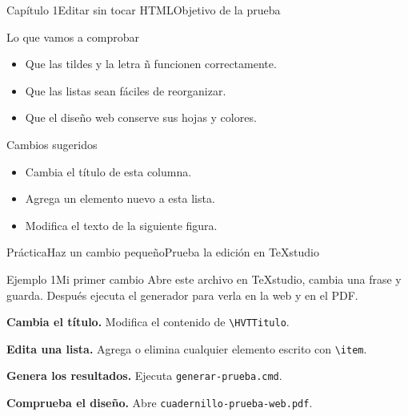 \documentclass{hvtbook}
\begin{document}
\HVTMakeTitle

\begin{HVTPage}{Capítulo 1}{Editar sin tocar HTML}{Objetivo de la prueba}


\begin{HVTGrid}
  \begin{HVTColumn}{Lo que vamos a comprobar}
    \begin{itemize}
      \item Que las tildes y la letra ñ funcionen correctamente.
      \item Que las listas sean fáciles de reorganizar.
      \item Que el diseño web conserve sus hojas y colores.
    \end{itemize}
  \end{HVTColumn}

  \begin{HVTColumn}{Cambios sugeridos}
    \begin{itemize}
      \item Cambia el título de esta columna.
      \item Agrega un elemento nuevo a esta lista.
      \item Modifica el texto de la siguiente figura.
    \end{itemize}
  \end{HVTColumn}
\end{HVTGrid}


\end{HVTPage}

\begin{HVTPage}{Práctica}{Haz un cambio pequeño}{Prueba la edición en TeXstudio}

\begin{HVTExample}{Ejemplo 1}{Mi primer cambio}
Abre este archivo en TeXstudio, cambia una frase y guarda. Después ejecuta el generador para verla en la web y en el PDF.
\end{HVTExample}

\begin{HVTSteps}
  \item \textbf{Cambia el título.} Modifica el contenido de \texttt{\textbackslash HVTTitulo}.
  \item \textbf{Edita una lista.} Agrega o elimina cualquier elemento escrito con \texttt{\textbackslash item}.
  \item \textbf{Genera los resultados.} Ejecuta \texttt{generar-prueba.cmd}.
  \item \textbf{Comprueba el diseño.} Abre \texttt{cuadernillo-prueba-web.pdf}.
\end{HVTSteps}

\end{HVTPage}
\end{document}
